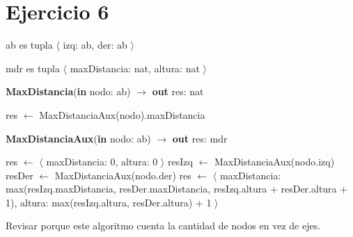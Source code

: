 \section{Ejercicio 6}

ab es tupla $\langle$ izq: ab, der: ab $\rangle$

mdr es tupla $\langle$ maxDistancia: nat, altura: nat $\rangle$

\begin{algorithm}[H]
\caption{
    \textbf{MaxDistancia}(\textbf{in} nodo: ab) $\to$ \textbf{out} res: nat
}
\begin{algorithmic}[1]
    \State res $\gets$ MaxDistanciaAux(nodo).maxDistancia
\end{algorithmic}
\Complexity{}
\end{algorithm}

\begin{algorithm}[H]
\caption{
    \textbf{MaxDistanciaAux}(\textbf{in} nodo: ab) $\to$ \textbf{out} res: mdr
}
\begin{algorithmic}[1]
        \State res $\gets$ $\langle$ maxDistancia: 0, altura: 0 $\rangle$
    \Else
        \State resIzq $\gets$ MaxDistanciaAux(nodo.izq)
        \State resDer $\gets$ MaxDistanciaAux(nodo.der)
        \State res $\gets$ $\langle$
        \State \;\; maxDistancia: max(resIzq.maxDistancia, resDer.maxDistancia, resIzq.altura + resDer.altura + 1),
        \State \;\; altura: max(resIzq.altura, resDer.altura) + 1
        \State $\rangle$
    \EndIf
\end{algorithmic}
\Complexity{}
\end{algorithm}

Revisar porque este algoritmo cuenta la cantidad de nodos en vez de ejes.
